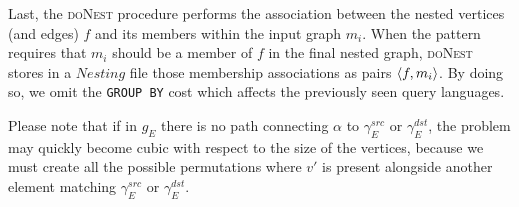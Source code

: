 Last, the \textsc{doNest} procedure performs the association between the nested vertices (and edges) $f$ and its members within the input graph $m_i$. When the pattern requires that $m_i$ should be a member of $f$ in the final nested graph,  \textsc{doNest} stores in a $Nesting$ file those membership associations as pairs $\Braket{f,m_i}$. By doing so, we omit the \texttt{GROUP BY} cost which affects the previously seen query languages. 



Please note that if in $g_E$ there is no path connecting $\alpha$ to $\gamma_E^{src}$ or $\gamma_E^{dst}$, the problem may quickly become cubic with respect to the size of the vertices, because we must create all the possible permutations where $v'$ is present alongside another element matching $\gamma_E^{src}$ or $\gamma_E^{dst}$.
